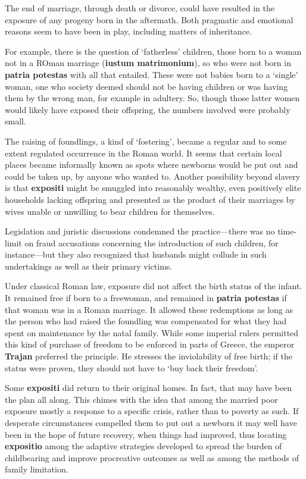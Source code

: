 \begin{rmk}
    The end of marriage, through death or divorce, could have resulted in the exposure of any progeny born in the aftermath. Both pragmatic and emotional reasons seem to have been in play, including matters of inheritance.
\end{rmk}

For example, there is the question of `fatherless' children, those born to a woman not in a ROman marriage (\textbf{iustum matrimonium}), so who were not born in \textbf{patria potestas} with all that entailed. These were not babies born to a `single' woman, one who society deemed should not be having children or was having them by the wrong man, for example in adultery. So, though those latter women would likely have exposed their offspring, the numbers involved were probably small.

The raising of foundlings, a kind of `fostering', became a regular and to some extent regulated occurrence in the Roman world. It seems that certain local places became informally known as spots where newborns would be put out and could be taken up, by anyone who wanted to. Another possibility beyond slavery is that \textbf{expositi} might be smuggled into reasonably wealthy, even positively elite households lacking offspring and presented as the product of their marriages by wives unable or unwilling to bear children for themselves. 

\begin{nte}
    Legislation and juristic discussions condemned the practice---there was no time-limit on fraud accusations concerning the introduction of such children, for instance---but they also recognized that husbands might collude in such undertakings as well as their primary victims.
\end{nte}

Under classical Roman law, exposure did not affect the birth status of the infant. It remained free if born to a freewoman, and remained in \textbf{patria potestas} if that woman was in a Roman marriage. It allowed these redemptions as long as the person who had raised the foundling was compensated for what they had spent on maintenance by the natal family. While some imperial rulers permitted this kind of purchase of freedom to be enforced in parts of Greece, the emperor \textbf{Trajan} preferred the principle. He stresses the inviolability of free birth; if the status were proven, they should not have to `buy back their freedom'.

Some \textbf{expositi} did return to their original homes. In fact, that may have been the plan all along. This chimes with the idea that among the married poor exposure mostly a response to a specific crisis, rather than to poverty as such. If desperate circumstances compelled them to put out a newborn it may well have been in the hope of future recovery, when things had improved, thus locating \textbf{expositio} among the adaptive strategies developed to spread the burden of childbearing and improve procreative outcomes as well as among the methods of family limitation.

